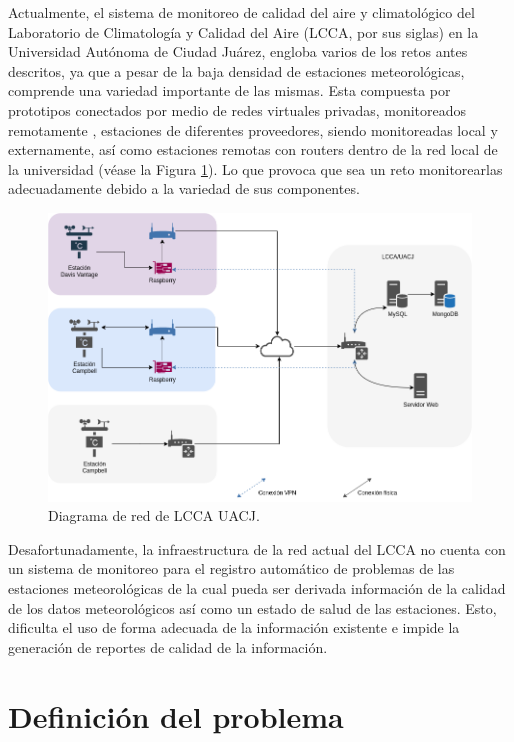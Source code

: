 Actualmente, el sistema de monitoreo de calidad del aire y climatológico del Laboratorio de Climatología y Calidad del Aire (LCCA, por sus siglas) en la Universidad Autónoma de Ciudad Juárez, engloba varios de los retos antes descritos, ya que a pesar de la baja densidad de estaciones meteorológicas, comprende una variedad importante de las mismas. Esta compuesta por prototipos conectados por medio de redes virtuales privadas, monitoreados remotamente \cite{red_climatologica_uacj}, estaciones de diferentes proveedores, siendo monitoreadas local y externamente, así como estaciones remotas con routers dentro de la red local de la universidad (véase la Figura \ref{fig:current_network}). Lo que provoca que sea un reto monitorearlas adecuadamente debido a la variedad de sus componentes.


\begin{figure}[!ht]
	\centering
	\includegraphics[width=.80\linewidth]{images/diagrams/red_lcca.drawio.png}
	\caption{Diagrama de red de LCCA UACJ.}
	\label{fig:current_network}
\end{figure}

Desafortunadamente, la infraestructura de la red actual del LCCA no cuenta con un sistema de monitoreo para el registro automático de problemas de las estaciones meteorológicas de la cual pueda ser derivada información de la calidad de los datos meteorológicos así como un estado de salud de las estaciones. Esto, dificulta el uso de forma adecuada de la información existente e impide la generación de reportes de calidad de la información.

\section{Definición del problema}

